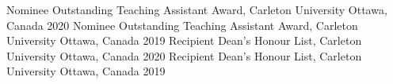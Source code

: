 



\begin{cvhonors}

  \cvhonor
    {Nominee} %
    {Outstanding Teaching Assistant Award, Carleton University} %
    {Ottawa, Canada} %
    {2020} %
  \cvhonor
    {Nominee} %
    {Outstanding Teaching Assistant Award, Carleton University} %
    {Ottawa, Canada} %
    {2019} %
  \cvhonor
    {Recipient} %
    {Dean's Honour List, Carleton University} %
    {Ottawa, Canada} %
    {2020} %
  \cvhonor
    {Recipient} %
    {Dean's Honour List, Carleton University} %
    {Ottawa, Canada} %
    {2019} %

\end{cvhonors}



